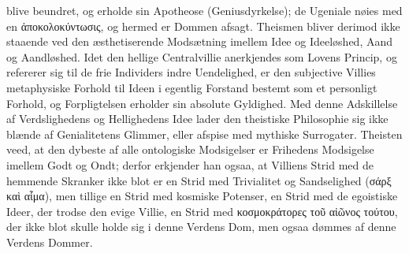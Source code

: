 \documentclass[12pt]{book}
\newcommand{\opage}[1]{\marginnote{\footnotesize\textit{[#1]}}}
\begin{document}
blive beundret, og erholde sin Apotheose (Geniusdyrkelse); de Ugeniale nøies med en
ἀποκολοκύντωσις, og hermed er Dommen afsagt. Theismen bliver derimod ikke staaende ved
den æsthetiserende Modsætning imellem Idee og Ideeløshed, Aand og Aandløshed. Idet den
hellige Centralvillie anerkjendes som Lovens Princip, og refererer sig til de frie
Individers indre Uendelighed, er den subjective
\opage{283} %
Villies metaphysiske Forhold til Ideen i egentlig Forstand bestemt som et personligt
Forhold, og Forpligtelsen erholder sin absolute Gyldighed. Med denne Adskillelse af
Verdslighedens og Hellighedens Idee lader den theistiske Philosophie sig ikke blænde af
Genialitetens Glimmer, eller afspise med mythiske Surrogater. Theisten veed, at den
dybeste af alle ontologiske Modsigelser er Frihedens Modsigelse imellem Godt og Ondt;
derfor erkjender han ogsaa, at Villiens Strid med de hemmende Skranker ikke blot er en
Strid med Trivialitet og Sandselighed (σάρξ καὶ αἷμα), men tillige en Strid med kosmiske
Potenser, en Strid med de egoistiske Ideer, der trodse den evige Villie, en Strid med
κοσμοκράτορες τοῦ αἰῶνος τούτου, der ikke blot skulle holde sig i denne Verdens Dom, men
ogsaa dømmes af denne Verdens Dommer.
\end{document}
